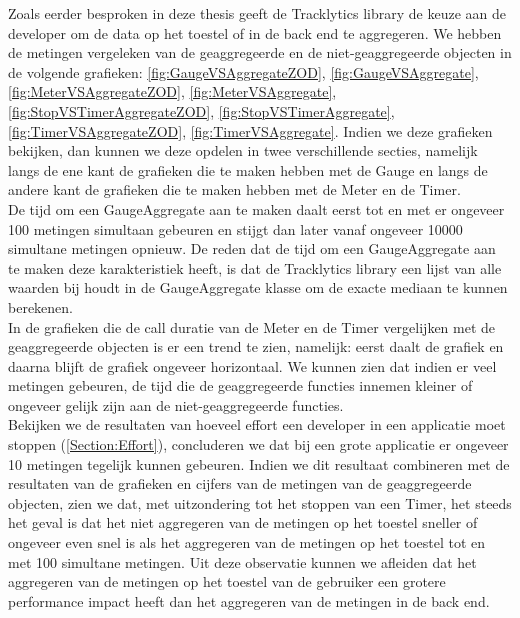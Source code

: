 Zoals eerder besproken in deze thesis geeft de Tracklytics library de keuze aan de developer om de data op het toestel of in de back end te aggregeren. We hebben de metingen vergeleken van de geaggregeerde en de niet-geaggregeerde objecten in de volgende grafieken: \ref{fig:GaugeVSAggregateZOD}, \ref{fig:GaugeVSAggregate}, \ref{fig:MeterVSAggregateZOD}, \ref{fig:MeterVSAggregate}, \ref{fig:StopVSTimerAggregateZOD}, \ref{fig:StopVSTimerAggregate}, \ref{fig:TimerVSAggregateZOD}, \ref{fig:TimerVSAggregate}. Indien we deze grafieken bekijken, dan kunnen we deze opdelen in twee verschillende secties, namelijk langs de ene kant de grafieken die te maken hebben met de Gauge en langs de andere kant de grafieken die te maken hebben met de Meter en de Timer. \\

De tijd om een GaugeAggregate aan te maken daalt eerst tot en met er ongeveer 100 metingen simultaan gebeuren en stijgt dan later vanaf ongeveer 10000 simultane metingen opnieuw. De reden dat de tijd om een GaugeAggregate aan te maken deze karakteristiek heeft, is dat de Tracklytics library een lijst van alle waarden bij houdt in de GaugeAggregate klasse om de exacte mediaan te kunnen berekenen. \\

In de grafieken die de call duratie van de Meter en de Timer vergelijken met de geaggregeerde objecten is er een trend te zien, namelijk: eerst daalt de grafiek en daarna blijft de grafiek ongeveer horizontaal. We kunnen zien dat indien er veel metingen gebeuren, de tijd die de geaggregeerde functies innemen kleiner of ongeveer gelijk zijn aan de niet-geaggregeerde functies. \\


Bekijken we de resultaten van hoeveel effort een developer in een applicatie moet stoppen (\ref{Section:Effort}), concluderen we dat bij een grote applicatie er ongeveer 10 metingen tegelijk kunnen gebeuren. Indien we dit resultaat combineren met de resultaten van de grafieken en cijfers van de metingen van de geaggregeerde objecten, zien we dat, met uitzondering tot het stoppen van een Timer, het steeds het geval is dat het niet aggregeren van de metingen op het toestel sneller of ongeveer even snel is als het aggregeren van de metingen op het toestel tot en met 100 simultane metingen. Uit deze observatie kunnen we afleiden dat het aggregeren van de metingen op het toestel van de gebruiker een grotere performance impact heeft dan het aggregeren van de metingen in de back end. \\

